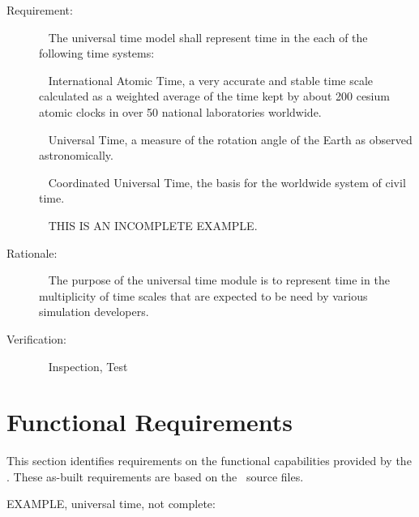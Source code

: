 \documentclass[twoside,11pt,titlepage]{report}
\begin{document}
\label{reqt:data_time_representation}
\begin{description}
  \item[Requirement:]\ \newline
    The universal time model shall represent time in the
    each of the following time systems:

    \label{reqt:data_time_rep_TAI}
      \ \newline
      International Atomic Time,
      a very accurate and stable time scale calculated as a weighted
      average of the time kept by about 200 cesium atomic clocks in
      over 50 national laboratories worldwide.

    \label{reqt:data_time_rep_UT1}
      \ \newline
      Universal Time, a measure of the rotation angle of the Earth
      as observed astronomically.

    \label{reqt:data_time_rep_UTC}
      \ \newline
      Coordinated Universal Time, the basis for the worldwide system
      of civil time.

      \ \newline
      THIS IS AN INCOMPLETE EXAMPLE.

  \item[Rationale:]\ \newline
    The purpose of the universal time module is to represent
    time in the multiplicity of time scales that are expected to be
    need by various simulation developers.

  \item[Verification:]\ \newline
    Inspection, Test
\end{description}


\section{Functional Requirements}\label{sec:func_reqts}

This section identifies requirements on the functional
capabilities provided by the \MODEL. These as-built requirements are
based on the \MODEL\ source files.

EXAMPLE, universal time, not complete:
\end{document}
